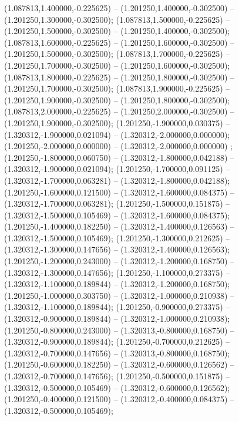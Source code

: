  (1.087813,1.400000,-0.225625) -- (1.201250,1.400000,-0.302500) -- (1.201250,1.300000,-0.302500);
 (1.087813,1.500000,-0.225625) -- (1.201250,1.500000,-0.302500) -- (1.201250,1.400000,-0.302500);
 (1.087813,1.600000,-0.225625) -- (1.201250,1.600000,-0.302500) -- (1.201250,1.500000,-0.302500);
 (1.087813,1.700000,-0.225625) -- (1.201250,1.700000,-0.302500) -- (1.201250,1.600000,-0.302500);
 (1.087813,1.800000,-0.225625) -- (1.201250,1.800000,-0.302500) -- (1.201250,1.700000,-0.302500);
 (1.087813,1.900000,-0.225625) -- (1.201250,1.900000,-0.302500) -- (1.201250,1.800000,-0.302500);
 (1.087813,2.000000,-0.225625) -- (1.201250,2.000000,-0.302500) -- (1.201250,1.900000,-0.302500);
 (1.201250,-1.900000,0.030375) -- (1.320312,-1.900000,0.021094) -- (1.320312,-2.000000,0.000000);
 (1.201250,-2.000000,0.000000) -- (1.320312,-2.000000,0.000000) ;
 (1.201250,-1.800000,0.060750) -- (1.320312,-1.800000,0.042188) -- (1.320312,-1.900000,0.021094);
 (1.201250,-1.700000,0.091125) -- (1.320312,-1.700000,0.063281) -- (1.320312,-1.800000,0.042188);
 (1.201250,-1.600000,0.121500) -- (1.320312,-1.600000,0.084375) -- (1.320312,-1.700000,0.063281);
 (1.201250,-1.500000,0.151875) -- (1.320312,-1.500000,0.105469) -- (1.320312,-1.600000,0.084375);
 (1.201250,-1.400000,0.182250) -- (1.320312,-1.400000,0.126563) -- (1.320312,-1.500000,0.105469);
 (1.201250,-1.300000,0.212625) -- (1.320312,-1.300000,0.147656) -- (1.320312,-1.400000,0.126563);
 (1.201250,-1.200000,0.243000) -- (1.320312,-1.200000,0.168750) -- (1.320312,-1.300000,0.147656);
 (1.201250,-1.100000,0.273375) -- (1.320312,-1.100000,0.189844) -- (1.320312,-1.200000,0.168750);
 (1.201250,-1.000000,0.303750) -- (1.320312,-1.000000,0.210938) -- (1.320312,-1.100000,0.189844);
 (1.201250,-0.900000,0.273375) -- (1.320312,-0.900000,0.189844) -- (1.320312,-1.000000,0.210938);
 (1.201250,-0.800000,0.243000) -- (1.320313,-0.800000,0.168750) -- (1.320312,-0.900000,0.189844);
 (1.201250,-0.700000,0.212625) -- (1.320312,-0.700000,0.147656) -- (1.320313,-0.800000,0.168750);
 (1.201250,-0.600000,0.182250) -- (1.320312,-0.600000,0.126562) -- (1.320312,-0.700000,0.147656);
 (1.201250,-0.500000,0.151875) -- (1.320312,-0.500000,0.105469) -- (1.320312,-0.600000,0.126562);
 (1.201250,-0.400000,0.121500) -- (1.320312,-0.400000,0.084375) -- (1.320312,-0.500000,0.105469);
